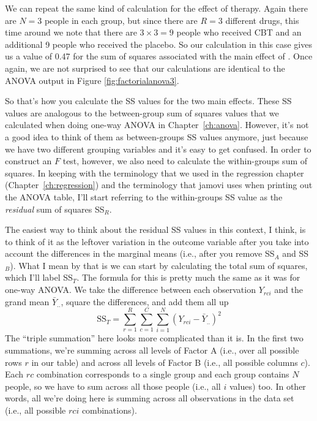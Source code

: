 \begin{mdframed}[style=MyFrame,nobreak=false]
We can repeat the same kind of calculation for the effect of therapy. Again there are $N=3$ people in each group, but since there are $R=3$ different drugs, this time around we note that there are $3 \times 3 = 9$ people who received CBT and an additional 9 people who received the placebo. So our calculation in this case gives us a value of 0.47 for the sum of squares associated with the main effect of . Once again, we are not surprised to see that our calculations are identical to the ANOVA output in Figure \ref{fig:factorialanova3}. 

So that's how you calculate the SS values for the two main effects. These SS values are analogous to the between-group sum of squares values that we calculated when doing one-way ANOVA in Chapter~\ref{ch:anova}. However, it's not a good idea to think of them as between-groups SS values anymore, just because we have two different grouping variables and it's easy to get confused. In order to construct an $F$ test, however, we also need to calculate the within-groups sum of squares. In keeping with the terminology that we used in the regression chapter (Chapter~\ref{ch:regression}) and the terminology that jamovi uses when printing out the ANOVA table, I'll start referring to the within-groups SS value as the {\it residual} sum of squares SS$_R$. 

The easiest way to think about the residual SS values in this context, I think, is to think of it as the leftover variation in the outcome variable after you take into account the differences in the marginal means (i.e., after you remove SS$_A$ and SS$_B$). What I mean by that is we can start by calculating the total sum of squares, which I'll label SS$_T$. The formula for this is pretty much the same as it was for one-way ANOVA. We take the difference between each observation $Y_{rci}$ and the grand mean $\bar{Y}_{..}$, square the differences, and add them all up
$$
\mbox{SS}_T = \sum_{r=1}^R \sum_{c=1}^C \sum_{i=1}^N \left( Y_{rci} - \bar{Y}_{..}\right)^2
$$
The ``triple summation'' here looks more complicated than it is. In the first two summations, we're summing across all levels of Factor A (i.e., over all possible rows $r$ in our table) and across all levels of Factor B (i.e., all possible columns $c$). Each $rc$ combination corresponds to a single group and each group contains $N$ people, so we have to sum across all those people (i.e., all $i$ values) too. In other words, all we're doing here is summing across all observations in the data set (i.e., all possible $rci$ combinations). 


\end{mdframed}
